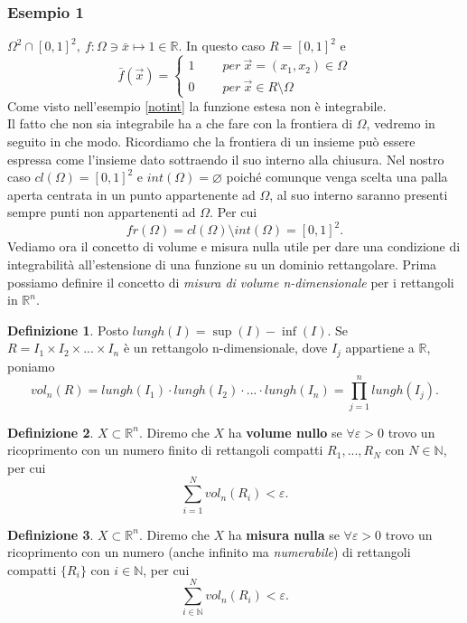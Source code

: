 \documentclass[10pt]{article}
\theoremstyle{plain}
\theoremstyle{definition}
\newtheorem{defn}{Definizione}
\begin{document}
\subsubsection{Esempio 1} \label{misnonnulla}
$\Omega ^2 \cap [0, 1]^2,\ f:\Omega \ni \bar{x} \mapsto 1\in\mathbb{R}.$ In questo caso $R=[0, 1]^2$ e {}
\begin{equation}
  \bar{f}(\vec{x})=
   \begin{cases}
   1\qquad \ per \ \vec{x}= (x_1, x_2) \in \Omega \\0 \qquad \ per \ \vec{x} \in R\setminus \Omega
   \end{cases}
\end{equation}
Come visto nell'esempio \ref{notint} la funzione estesa non è integrabile.
\\ Il fatto che non sia integrabile ha a che fare con la frontiera di $\Omega$, vedremo in seguito in che modo. Ricordiamo che la frontiera di un insieme può essere espressa come l'insieme dato sottraendo il suo interno alla chiusura. Nel nostro caso $cl(\Omega)=[0,1]^2$ e $int(\Omega)=\varnothing$ poiché comunque venga scelta una palla aperta centrata in un punto appartenente ad $\Omega$, al suo interno saranno presenti sempre punti non appartenenti ad $\Omega$. Per cui $$fr(\Omega)=cl(\Omega)\setminus int(\Omega)=[0,1]^2.$$
\newline
Vediamo ora il concetto di volume e misura nulla utile per dare una condizione di integrabilità all'estensione di una funzione su un dominio rettangolare.
Prima possiamo definire il concetto di \textit{misura di volume n-dimensionale} per i rettangoli in $\mathbb{R}^n$.
\begin{defn}
Posto $lungh(I)=\sup (I)-\inf (I)$.
Se $R = I_1\times I_2 \times ... \times I_n$ è un rettangolo n-dimensionale, dove $I_j$ appartiene a $\mathbb{R}$, poniamo $$vol_n(R)= lungh(I_1)\cdot lungh(I_2)\cdot ...\cdot lungh(I_n) = \prod_{j=1}^nlungh(I_j).$$
\end{defn}
\begin{defn}
$X\subset \mathbb{R}^n.$ Diremo che $X$ ha \textbf{volume nullo} se $\forall \varepsilon>0$ trovo un ricoprimento con un numero finito di rettangoli compatti $R_1, ..., R_N$ con $N\in \mathbb{N}$, per cui 
$$\sum_{i=1}^Nvol_n(R_i)<\varepsilon.$$
\end{defn}
\begin{defn}
$X\subset \mathbb{R}^n.$ Diremo che $X$ ha \textbf{misura nulla} se $\forall \varepsilon>0$ trovo un ricoprimento con un numero (anche infinito ma \textit{numerabile}) di rettangoli compatti $\{ R_i\}$ con $i\in \mathbb{N}$, per cui 
$$\sum_{i\in \mathbb{N}}^Nvol_n(R_i)<\varepsilon.$$
\end{defn}
\end{document}
